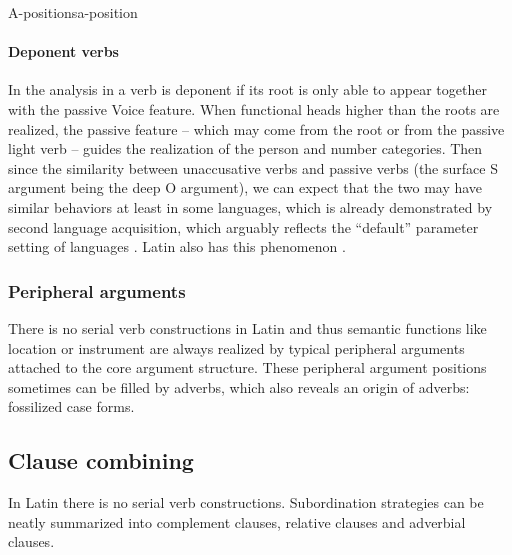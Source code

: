 \documentclass[a4paper, oneside]{report}
\newcommand*{\citepages}[1]{pp.~{#1}}
\begin{document}
\begin{theorybox}{A-positions}{a-position}
    \paragraph*{Deponent verbs} 
    In the analysis in \citet{embick2000features} 
    a verb is deponent if its root is only able to 
    appear together with the passive Voice feature. 
    When functional heads higher than the roots are realized,
    the passive feature -- which may come from the root or from the passive light verb -- 
    guides the realization of the person and number categories.
    Then since the similarity between unaccusative verbs and passive verbs
    (the surface S argument being the deep O argument),
    we can expect that
    the two may have similar behaviors at least in some languages,
    which is already demonstrated by second language acquisition,
    which arguably reflects the ``default'' parameter setting of languages \citep{balcom1997happened}.
    Latin also has this phenomenon \citep[\citepages{308-309}]{oniga2014latin}.
\end{theorybox}

\subsubsection{Peripheral arguments}

There is no serial verb constructions in Latin 
and thus semantic functions like location or instrument 
are always realized by typical peripheral arguments
attached to the core argument structure.
These peripheral argument positions sometimes can be filled by adverbs,
which also reveals an origin of adverbs: fossilized case forms.

\subsection{Clause combining}

In Latin there is no serial verb constructions.
Subordination strategies can be neatly summarized into 
complement clauses, relative clauses and adverbial clauses.
\end{document}
